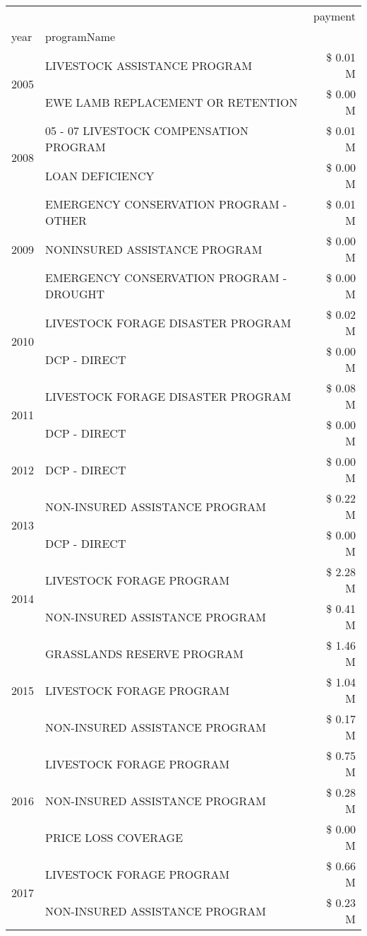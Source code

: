 \begin{tabular}{llr}
\toprule
 &  & payment \\
year & programName &  \\
\midrule
\multirow[t]{2}{*}{2005} & LIVESTOCK ASSISTANCE PROGRAM & \$ 0.01 M \\
 & EWE LAMB REPLACEMENT OR RETENTION & \$ 0.00 M \\
\cline{1-3}
\multirow[t]{2}{*}{2008} & 05 - 07 LIVESTOCK COMPENSATION PROGRAM & \$ 0.01 M \\
 & LOAN DEFICIENCY & \$ 0.00 M \\
\cline{1-3}
\multirow[t]{3}{*}{2009} & EMERGENCY CONSERVATION PROGRAM - OTHER & \$ 0.01 M \\
 & NONINSURED ASSISTANCE PROGRAM & \$ 0.00 M \\
 & EMERGENCY CONSERVATION PROGRAM - DROUGHT & \$ 0.00 M \\
\cline{1-3}
\multirow[t]{2}{*}{2010} & LIVESTOCK FORAGE DISASTER PROGRAM & \$ 0.02 M \\
 & DCP - DIRECT & \$ 0.00 M \\
\cline{1-3}
\multirow[t]{2}{*}{2011} & LIVESTOCK FORAGE DISASTER PROGRAM & \$ 0.08 M \\
 & DCP - DIRECT & \$ 0.00 M \\
\cline{1-3}
2012 & DCP - DIRECT & \$ 0.00 M \\
\cline{1-3}
\multirow[t]{2}{*}{2013} & NON-INSURED ASSISTANCE PROGRAM & \$ 0.22 M \\
 & DCP - DIRECT & \$ 0.00 M \\
\cline{1-3}
\multirow[t]{2}{*}{2014} & LIVESTOCK FORAGE PROGRAM & \$ 2.28 M \\
 & NON-INSURED ASSISTANCE PROGRAM & \$ 0.41 M \\
\cline{1-3}
\multirow[t]{3}{*}{2015} & GRASSLANDS RESERVE PROGRAM & \$ 1.46 M \\
 & LIVESTOCK FORAGE PROGRAM & \$ 1.04 M \\
 & NON-INSURED ASSISTANCE PROGRAM & \$ 0.17 M \\
\cline{1-3}
\multirow[t]{3}{*}{2016} & LIVESTOCK FORAGE PROGRAM & \$ 0.75 M \\
 & NON-INSURED ASSISTANCE PROGRAM & \$ 0.28 M \\
 & PRICE LOSS COVERAGE & \$ 0.00 M \\
\cline{1-3}
\multirow[t]{3}{*}{2017} & LIVESTOCK FORAGE PROGRAM & \$ 0.66 M \\
 & NON-INSURED ASSISTANCE PROGRAM & \$ 0.23 M \\

\end{tabular}
